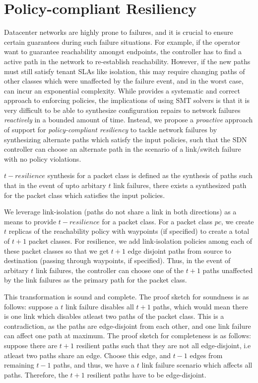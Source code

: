 \section{Policy-compliant Resiliency}
Datacenter networks are highly prone to failures, 
and it is crucial to ensure certain guarantees during such failure
situations. For example, if the operator want to guarantee
reachability amongst endpoints, the controller has to find a active
path in the network to re-establish reachability. However, if the new
paths must still satisfy tenant SLAs like isolation, this may require 
changing paths of other classes which were unaffected by the failure event,
and in the worst case, can incur an exponential complexity.
While \name provides a systematic and correct approach
to enforcing policies, the implications of using SMT solvers is that
it is very difficult to be able to synthesize configuration repairs to
network failures \emph{reactively} in a bounded amount of time. 
Instead, we propose a \emph{proactive} approach 
of support for \emph{policy-compliant resiliency} to tackle network failures
by synthesizing alternate paths which satisfy the input policies, such that the SDN controller 
can choose an alternate path in the scenario of a link/switch failure with no
policy violations.

\begin{mydef}
	$t-resilience$ synthesis for a packet class is defined as the
	synthesis of paths such that in the event of upto arbitary
	$t$ link failures, there exists a synthesized path for the packet class which
	satisfies the input policies. 
\end{mydef}

We leverage link-isolation (paths do not share a link in both directions)
 as a means to provide $t-resilience$ for a packet class. For a 
packet class $pc$, we create $t$ replicas of the reachability policy with waypoints (if specified)
to create a total of $t+1$ packet classes. For resilience, we add link-isolation policies among each
of these packet classes so that we get $t+1$ edge disjoint paths from source to destination
(passing through waypoints, if specified). Thus, in the event of arbitary $t$ link failures, the 
controller can choose one of the $t+1$ paths unaffected by the link failures as the primary
path for the packet class.

This transformation is sound and complete. The proof sketch for soundness
 is as follows: suppose a $t$ link failure
disables all $t+1$ paths, which would mean there is one link which disables atleast two paths
of the packet class. This is a contradiction, as the paths are edge-disjoint from each other, and one
link failure can affect one path at maximum. The proof sketch for completeness is as follows:
suppose there are $t+1$ resilient paths such that they are not all edge-disjoint, i.e atleast two
paths share an edge. Choose this edge, and $t-1$ edges from remaining $t-1$ paths, and
thus, we have a $t$ link failure scenario which affects all paths. Therefore, the $t+1$ resilient
paths have to be edge-disjoint.

